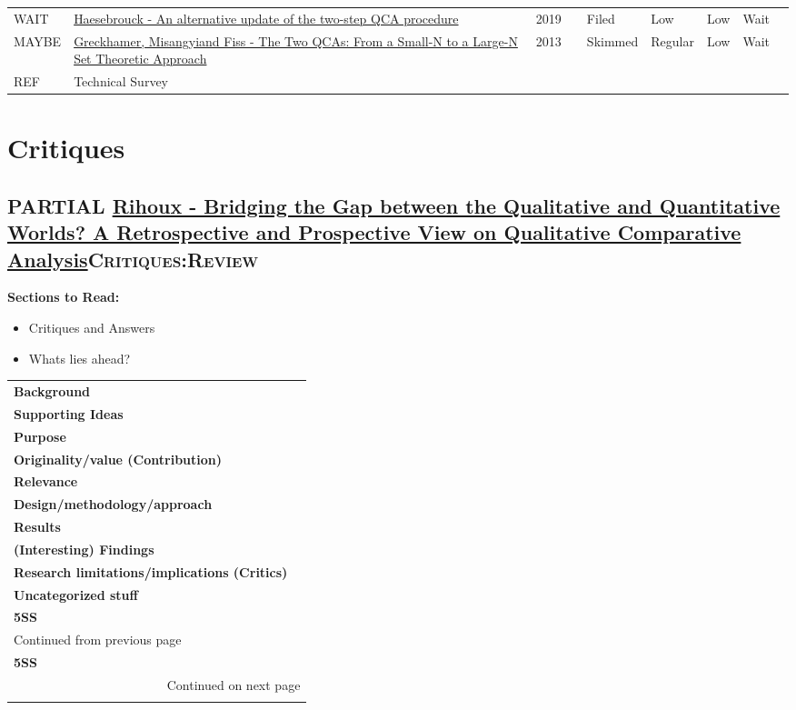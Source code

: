 \documentclass[11pt]{article}
\begin{document}
\begin{center}
\begin{tabular}{llrllllll}
WAIT & \href{https://doi.org/10.1007/s11135-019-00893-7}{Haesebrouck - An alternative update of the two-step QCA procedure} & 2019 &  & Filed & Low & Low & Wait & \\
MAYBE & \href{https://doi.org/10.1108/S0733-558X(2013)0000038007}{Greckhamer, Misangyiand Fiss - The Two QCAs: From a Small-N to a Large-N Set Theoretic Approach} & 2013 &  & Skimmed & Regular & Low & Wait & \\
REF & Technical Survey &  &  &  &  &  &  & \\
\end{tabular}
\end{center}



\section*{Critiques}
\label{sec:org51276d6}
\subsection*{{\bfseries\sffamily PARTIAL} \href{https://doi.org/10.1177\%2F1525822X03257690}{Rihoux - Bridging the Gap between the Qualitative and Quantitative Worlds? A Retrospective and Prospective View on Qualitative Comparative Analysis}\hfill{}\textsc{Critiques:Review}}
\label{sec:org5fc3daa}
\textbf{Sections to Read:}

\begin{itemize}
\item Critiques and Answers
\item Whats lies ahead?
\end{itemize}

\begin{longtable}{l|p{}}
\hline
\hline
\textbf{Background} & \\
\textbf{Supporting Ideas} & \\
\textbf{Purpose} & \\
\textbf{Originality/value (Contribution)} & \\
\textbf{Relevance} & \\
\textbf{Design/methodology/approach} & \\
\textbf{Results} & \\
\textbf{(Interesting) Findings} & \\
\textbf{Research limitations/implications (Critics)} & \\
\textbf{Uncategorized stuff} & \\
\textbf{5SS} & \\
\hline
\endfirsthead
\multicolumn{2}{l}{Continued from previous page} \\

\textbf{5SS} &  \\

\hline
\endhead
\hline\multicolumn{2}{r}{Continued on next page} \\
\endfoot
\endlastfoot
\hline
\hline
\end{longtable}
\end{document}
